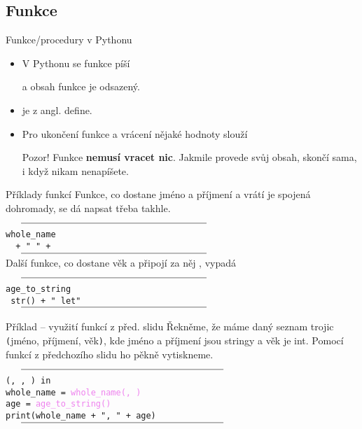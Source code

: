 \subsection[Funkce]{Funkce}

\begin{frame}{Funkce/procedury v Pythonu}
 \begin{itemize}
  \item<1-> V Pythonu se funkce píší
   \begin{center}
   \end{center}
   a obsah funkce je odsazený.
  \item<2-> \texttt{} je z angl. \alert{def}ine.
  \item<3-> Pro ukončení funkce a vrácení nějaké hodnoty slouží
   \begin{center}
   \end{center}
   \alert{Pozor!} Funkce \textbf{nemusí vracet nic}. Jakmile provede svůj obsah,
   skončí sama, i když \texttt{} nikam nenapíšete.
 \end{itemize}
\end{frame}

\begin{frame}{Příklady funkcí}
 Funkce, co dostane jméno a příjmení a vrátí je spojená dohromady, se dá napsat
 třeba takhle.
 $\vcenter{\rule{.55\textwidth}{0.4pt}}$
 \texttt{ whole_name\mlb{(}\mlb{,} \mlb{):}}\\
 \hspace{4ex}\texttt{ ~+~"~"~+~}
 $\vcenter{\rule{.55\textwidth}{0.4pt}}$
 \pause
 Další funkce, co dostane věk a připojí za něj , vypadá
 $\vcenter{\rule{.55\textwidth}{0.4pt}}$
 \texttt{ age_to_string\mlb{(}\mlb{):}}\\
 \hspace{4ex}\texttt{ str()~+~"~let"}\\
 $\vcenter{\rule{.55\textwidth}{0.4pt}}$
\end{frame}

\begin{frame}{Příklad -- využití funkcí z před. slidu}
 Řekněme, že máme daný seznam \texttt{} trojic \texttt{(}jméno,
 příjmení, věk\texttt{)}, kde jméno a příjmení jsou stringy a věk je int. Pomocí
 funkcí z předchozího slidu ho pěkně vytiskneme.
 $\vcenter{\rule{.6\textwidth}{0.4pt}}$
 \texttt{ (, ,
 )~in~\mlb{:}}\\
 \hspace{4ex}\texttt{whole_name =
 \textcolor{violet}{whole_name(}\textcolor{violet}{,}
 \textcolor{violet}{)}}\\
 \hspace{4ex}\texttt{age =
 \textcolor{violet}{age_to_string(}\textcolor{violet}{)}}\\
 \hspace{4ex}\texttt{print(whole_name~+~",~"~+~age)}
 $\vcenter{\rule{.6\textwidth}{0.4pt}}$
\end{frame}
